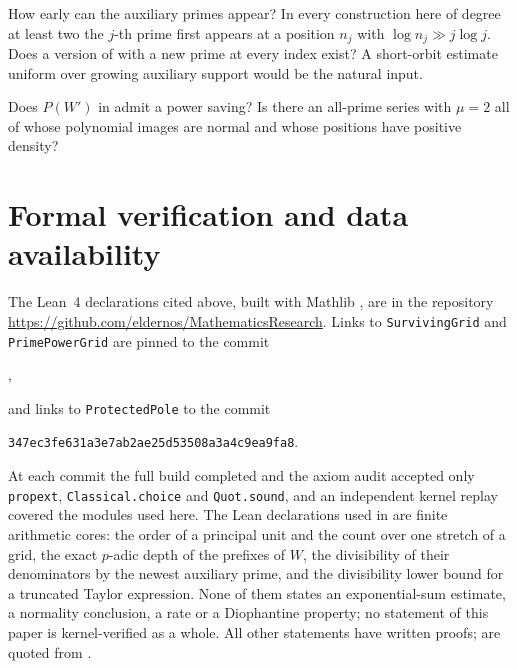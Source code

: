 \documentclass[11pt]{article}
\newcommand{\ttt}[1]{\texttt{#1}}
\newcommand{\phaseXXIcommit}{347ec3fe631a3e7ab2ae25d53508a3a4c9ea9fa8}
\begin{document}
\begin{question}
How early can the auxiliary primes appear? In every construction here of degree at least two the $j$-th prime first appears at a
position $n_j$ with $\log n_j\gg j\log j$. Does a version of  with a new prime at every index exist? A
short-orbit estimate uniform over growing auxiliary support would be the natural input.
\end{question}

\begin{question}
Does $P(W')$ in  admit a power saving? Is there an all-prime series with $\mu=2$ all of whose polynomial images
are normal and whose positions have positive density?
\end{question}

\section{Formal verification and data availability}\label{sec:formal}

The Lean~4 \cite{Lean4} declarations cited above, built with Mathlib \cite{Mathlib}, are in the repository
\url{https://github.com/eldernos/MathematicsResearch}. Links to \ttt{SurvivingGrid} and \ttt{PrimePowerGrid} are pinned to the
commit
\begin{center}\ttt{\phaseXIXcommit},\end{center}
and links to \ttt{ProtectedPole} to the commit
\begin{center}\ttt{\phaseXXIcommit}.\end{center}
At each commit the full build completed and the axiom audit accepted only \ttt{propext}, \ttt{Classical.choice} and
\ttt{Quot.sound}, and an independent kernel replay covered the modules used here. The Lean declarations used in
 are finite arithmetic cores: the order of a principal unit and the count
over one stretch of a grid, the exact $p$-adic depth of the prefixes of $W$, the divisibility of their denominators by the newest
auxiliary prime, and the divisibility lower bound for a truncated Taylor expression. None of them states an exponential-sum
estimate, a normality conclusion, a rate or a Diophantine property; no statement of this paper is kernel-verified as a whole.
All other statements have written proofs;  are quoted from \cite{PaperVIIv2}.
\end{document}
